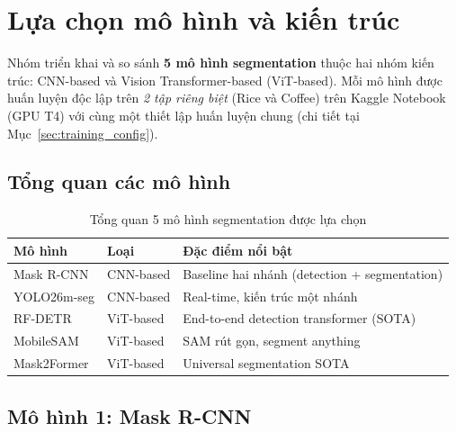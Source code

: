 
\section{Lựa chọn mô hình và kiến trúc}
\label{sec:models}

Nhóm triển khai và so sánh \textbf{5 mô hình segmentation} thuộc hai nhóm kiến trúc: CNN-based và Vision Transformer-based (ViT-based). Mỗi mô hình được huấn luyện độc lập trên \emph{2 tập riêng biệt} (Rice và Coffee) trên Kaggle Notebook (GPU T4) với cùng một thiết lập huấn luyện chung (chi tiết tại Mục~\ref{sec:training_config}).

\subsection{Tổng quan các mô hình}

\begin{table}[H]
    \caption{Tổng quan 5 mô hình segmentation được lựa chọn}
    \centering
    \begin{tabularx}{\textwidth}{llX}
        \toprule
        \textbf{Mô hình} & \textbf{Loại} & \textbf{Đặc điểm nổi bật}                     \\
        \midrule
        Mask R-CNN       & CNN-based     & Baseline hai nhánh (detection + segmentation) \\
        YOLO26m-seg      & CNN-based     & Real-time, kiến trúc một nhánh                \\
        RF-DETR          & ViT-based     & End-to-end detection transformer (SOTA)       \\
        MobileSAM        & ViT-based     & SAM rút gọn, segment anything                 \\
        Mask2Former      & ViT-based     & Universal segmentation SOTA                   \\
        \bottomrule
    \end{tabularx}
    \label{tab:model_overview}
\end{table}

\subsection{Mô hình 1: Mask R-CNN}
\label{subsec:maskrcnn}


